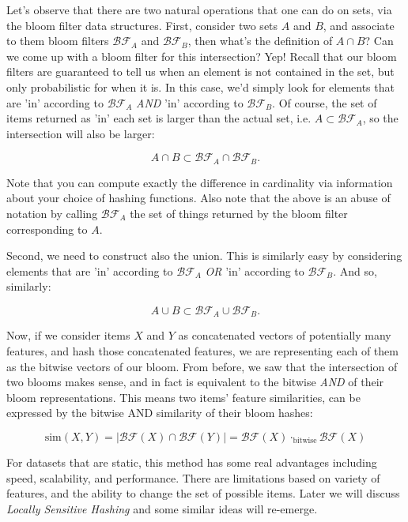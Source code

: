 Let's observe that there are two natural operations that one can do on sets, via the bloom filter data structures. First, consider two sets $A$ and $B$, and associate to them bloom filters $\mathcal{BF}_A$ and $\mathcal{BF}_B$, then what's the definition of $A\cap B$? Can we come up with a bloom filter for this intersection? Yep! Recall that our bloom filters are guaranteed to tell us when an element is not contained in the set, but only probabilistic for when it is. In this case, we'd simply look for elements that are 'in' according to $\mathcal{BF}_A$ \emph{AND} 'in' according to $\mathcal{BF}_B$. Of course, the set of items returned as 'in' each set is larger than the actual set, i.e. $A\subset \mathcal{BF}_A$, so the intersection will also be larger:

\begin{equation}
    A\cap B \subset \mathcal{BF}_A \cap \mathcal{BF}_B.
\end{equation}

Note that you can compute exactly the difference in cardinality via information about your choice of hashing functions. Also note that the above is an abuse of notation by calling $\mathcal{BF}_A$ the set of things returned by the bloom filter corresponding to $A$.

Second, we need to construct also the union. This is similarly easy by considering elements that are 'in' according to $\mathcal{BF}_A$ \emph{OR} 'in' according to $\mathcal{BF}_B$. And so, similarly:

\begin{equation}
    A\cup B \subset \mathcal{BF}_A \cup \mathcal{BF}_B.
\end{equation}

Now, if we consider items $X$ and $Y$ as concatenated vectors of potentially many features, and hash those concatenated features, we are representing each of them as the bitwise vectors of our bloom. From before, we saw that the intersection of two blooms makes sense, and in fact is equivalent to the bitwise \emph{AND} of their bloom representations. This means two items' feature similarities, can be expressed by the bitwise AND similarity of their bloom hashes:

\begin{equation}
    \mathrm{sim}(X,Y)=|\mathcal{BF}(X)\cap \mathcal{BF}(Y)|=\mathcal{BF}(X)\cdot_{\mathrm{bitwise}}\mathcal{BF}(X)
\end{equation}

For datasets that are static, this method has some real advantages including speed, scalability, and performance. There are limitations based on variety of features, and the ability to change the set of possible items. Later we will discuss \emph{Locally Sensitive Hashing} and some similar ideas will re-emerge. 

